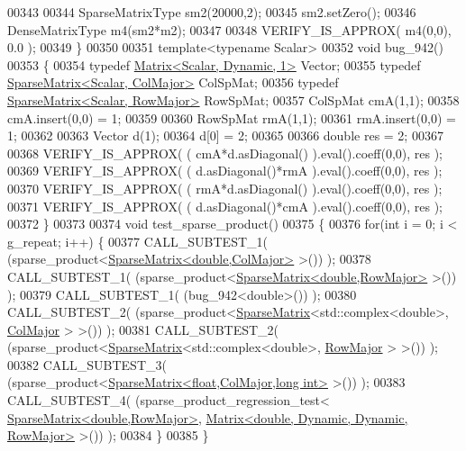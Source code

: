 \begin{DoxyCode}
00343 
00344   SparseMatrixType sm2(20000,2);
00345   sm2.setZero();
00346   DenseMatrixType m4(sm2*m2);
00347 
00348   VERIFY\_IS\_APPROX( m4(0,0), 0.0 );
00349 \}
00350 
00351 \textcolor{keyword}{template}<\textcolor{keyword}{typename} Scalar>
00352 \textcolor{keywordtype}{void} bug\_942()
00353 \{
00354   \textcolor{keyword}{typedef} \hyperlink{group___core___module}{Matrix<Scalar, Dynamic, 1>}     Vector;
00355   \textcolor{keyword}{typedef} \hyperlink{group___sparse_core___module}{SparseMatrix<Scalar, ColMajor>} ColSpMat;
00356   \textcolor{keyword}{typedef} \hyperlink{group___sparse_core___module}{SparseMatrix<Scalar, RowMajor>} RowSpMat;
00357   ColSpMat cmA(1,1);
00358   cmA.insert(0,0) = 1;
00359 
00360   RowSpMat rmA(1,1);
00361   rmA.insert(0,0) = 1;
00362 
00363   Vector d(1);
00364   d[0] = 2;
00365   
00366   \textcolor{keywordtype}{double} res = 2;
00367   
00368   VERIFY\_IS\_APPROX( ( cmA*d.asDiagonal() ).eval().coeff(0,0), res );
00369   VERIFY\_IS\_APPROX( ( d.asDiagonal()*rmA ).eval().coeff(0,0), res );
00370   VERIFY\_IS\_APPROX( ( rmA*d.asDiagonal() ).eval().coeff(0,0), res );
00371   VERIFY\_IS\_APPROX( ( d.asDiagonal()*cmA ).eval().coeff(0,0), res );
00372 \}
00373 
00374 \textcolor{keywordtype}{void} test\_sparse\_product()
00375 \{
00376   \textcolor{keywordflow}{for}(\textcolor{keywordtype}{int} i = 0; i < g\_repeat; i++) \{
00377     CALL\_SUBTEST\_1( (sparse\_product<\hyperlink{group___sparse_core___module_class_eigen_1_1_sparse_matrix}{SparseMatrix<double,ColMajor>} >()) );
00378     CALL\_SUBTEST\_1( (sparse\_product<\hyperlink{group___sparse_core___module_class_eigen_1_1_sparse_matrix}{SparseMatrix<double,RowMajor>} >()) );
00379     CALL\_SUBTEST\_1( (bug\_942<double>()) );
00380     CALL\_SUBTEST\_2( (sparse\_product<\hyperlink{group___sparse_core___module_class_eigen_1_1_sparse_matrix}{SparseMatrix}<std::complex<double>, 
      \hyperlink{group__enums_ggaacded1a18ae58b0f554751f6cdf9eb13a0cbd4bdd0abcfc0224c5fcb5e4f6669a}{ColMajor} > >()) );
00381     CALL\_SUBTEST\_2( (sparse\_product<\hyperlink{group___sparse_core___module_class_eigen_1_1_sparse_matrix}{SparseMatrix}<std::complex<double>, 
      \hyperlink{group__enums_ggaacded1a18ae58b0f554751f6cdf9eb13acfcde9cd8677c5f7caf6bd603666aae3}{RowMajor} > >()) );
00382     CALL\_SUBTEST\_3( (sparse\_product<\hyperlink{group___sparse_core___module_class_eigen_1_1_sparse_matrix}{SparseMatrix<float,ColMajor,long int>}
       >()) );
00383     CALL\_SUBTEST\_4( (sparse\_product\_regression\_test<
      \hyperlink{group___sparse_core___module_class_eigen_1_1_sparse_matrix}{SparseMatrix<double,RowMajor>}, 
      \hyperlink{group___core___module_class_eigen_1_1_matrix}{Matrix<double, Dynamic, Dynamic, RowMajor>} >()) );
00384   \}
00385 \}
\end{DoxyCode}

